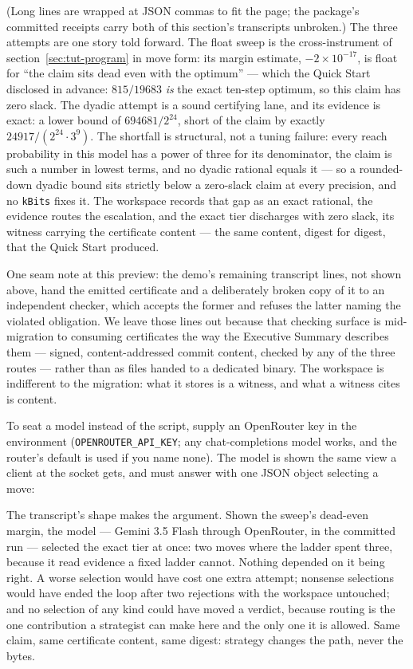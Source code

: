 

(Long lines are wrapped at JSON commas to fit the page; the
package's committed receipts carry both of this section's
transcripts unbroken.) The three attempts are one story told
forward. The float sweep is the cross-instrument of
section~\ref{sec:tut-program} in move form: its margin estimate,
$-2\times 10^{-17}$, is float for ``the claim sits dead even with
the optimum'' --- which the Quick Start disclosed in
advance: $815/19683$ \emph{is} the exact ten-step optimum, so this
claim has zero slack. The dyadic attempt is a sound certifying lane,
and its evidence is exact: a lower bound of $694681/2^{24}$, short
of the claim by exactly $24917/(2^{24}\cdot 3^{9})$. The shortfall
is structural, not a tuning failure: every reach probability in this
model has a power of three for its denominator, the claim is such a
number in lowest terms, and no dyadic rational equals it --- so a
rounded-down dyadic bound sits strictly below a zero-slack claim at
every precision, and no \texttt{kBits} fixes it. The workspace
records that gap as an exact rational, the evidence routes the
escalation, and the exact tier discharges with zero slack, its
witness carrying the certificate content --- the same content,
digest for digest, that the Quick Start produced.

One seam note at this preview: the demo's remaining transcript
lines, not shown above, hand the emitted certificate and a
deliberately broken copy of it to an independent checker, which
accepts the former and refuses the latter naming the violated
obligation. We leave those lines out because that checking surface
is mid-migration to consuming certificates the way the Executive
Summary describes them --- signed, content-addressed commit content,
checked by any of the three routes --- rather than as files handed
to a dedicated binary. The workspace is indifferent to the
migration: what it stores is a witness, and what a witness cites is
content.

To seat a model instead of the script, supply an OpenRouter key in
the environment (\texttt{OPENROUTER\_API\_KEY}; any chat-completions
model works, and the router's default is used if you name none). The
model is shown the same view a client at the socket gets, and must
answer with one JSON object selecting a move:



The transcript's shape makes the argument. Shown the sweep's
dead-even margin, the model --- Gemini 3.5 Flash through OpenRouter,
in the committed run --- selected the exact tier at once: two moves
where the ladder spent three, because it read evidence a fixed
ladder cannot. Nothing depended on it being right. A worse selection
would have cost one extra attempt; nonsense selections would have
ended the loop after two rejections with the workspace untouched;
and no selection of any kind could have moved a verdict, because
routing is the one contribution a strategist can make here and the
only one it is allowed. Same claim, same certificate content, same
digest: strategy changes the path, never the bytes.

